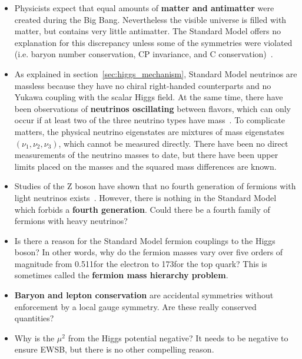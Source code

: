 \begin{itemize}
	\item Physicists expect that equal amounts of \textbf{matter and antimatter} were created during the Big Bang. Nevertheless the visible universe is filled with matter, but contains very little antimatter. The Standard Model offers no explanation for this discrepancy unless some of the symmetries were violated (i.e. baryon number conservation, CP invariance, and C conservation)~\cite{0038-5670-34-5-A08,KUZMIN198536}.
	\item As explained in section~\ref{sec:higgs_mechanism}, Standard Model neutrinos are massless because they have no chiral right-handed counterparts and no Yukawa coupling with the scalar Higgs field. At the same time, there have been observations of \textbf{neutrinos oscillating} between flavors, which can only occur if at least two of the three neutrino types have mass~\cite{Abe:2008aa,Abe:2014ugx,Agafonova:2014ptn,Agashe:2014kda,PhysRevLett.81.1158}. To complicate matters, the physical neutrino eigenstates are mixtures of mass eigenstates $\left(\nu_{1},\nu_{2},\nu_{3}\right)$, which cannot be measured directly. There have been no direct measurements of the neutrino masses to date, but there have been upper limits placed on the masses and the squared mass differences are known.
	\item Studies of the Z boson have shown that no fourth generation of fermions with light neutrinos exists~\cite{DECAMP1990399}. However, there is nothing in the Standard Model which forbids a \textbf{fourth generation}. Could there be a fourth family of fermions with heavy neutrinos?
	\item Is there a reason for the Standard Model fermion couplings to the Higgs boson? In other words, why do the fermion masses vary over five orders of magnitude from 0.511\mev for the electron to 173\gev for the top quark? This is sometimes called the \textbf{fermion mass hierarchy problem}.
	\item \textbf{Baryon and lepton conservation} are accidental symmetries without enforcement by a local gauge symmetry. Are these really conserved quantities?
	\item Why is the $\mu^{2}$ from the Higgs potential negative? It needs to be negative to ensure EWSB, but there is no other compelling reason.

\end{itemize}
